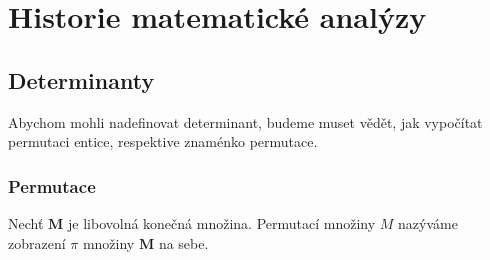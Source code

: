 \chapter{Historie matematické analýzy}\label{mai:IchapXII}
\minitoc
  \section{Determinanty}
    Abychom mohli nadefinovat determinant, budeme muset vědět, jak vypočítat permutaci entice, 
    respektive znaménko permutace.
    \subsection{Permutace}
      \begin{definition}\label{permutace}
        Nechť \(\mathbf{M}\) je libovolná konečná množina. Permutací množiny \(M\) nazýváme 
        zobrazení \(\pi\) množiny \(\mathbf{M}\) na sebe.
      \end{definition}
      
